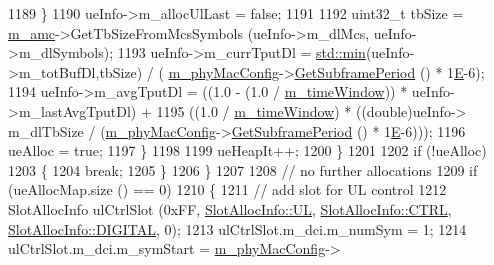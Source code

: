 \begin{DoxyCode}
1189                                 \}
1190                                 ueInfo->m\_allocUlLast = \textcolor{keyword}{false};
1191 
1192                                 uint32\_t tbSize = \hyperlink{classns3_1_1MmWaveFlexTtiPfMacScheduler_ab9cf29146f4e3094526de08ffe08b193}{m\_amc}->GetTbSizeFromMcsSymbols (ueInfo->m\_dlMcs, 
      ueInfo->m\_dlSymbols);
1193                                 ueInfo->m\_currTputDl = \hyperlink{80211b_8c_ac6afabdc09a49a433ee19d8a9486056d}{std::min}(ueInfo->m\_totBufDl,tbSize) / (
      \hyperlink{classns3_1_1MmWaveMacScheduler_a24d7af4971d2e500fe543cefbafa2fd9}{m\_phyMacConfig}->\hyperlink{classns3_1_1MmWavePhyMacCommon_a1d402260d29c8931dd3dde73b295e23d}{GetSubframePeriod} () * 1\hyperlink{packet-test-suite_8cc_a171669980e29849aa5e3722d573181ee}{E}-6);
1194                                 ueInfo->m\_avgTputDl = ((1.0 - (1.0 / 
      \hyperlink{classns3_1_1MmWaveFlexTtiPfMacScheduler_adc8b66b1890b4ba9d14f1d294af36b07}{m\_timeWindow})) * ueInfo->m\_lastAvgTputDl) +
1195                                                 ((1.0 / \hyperlink{classns3_1_1MmWaveFlexTtiPfMacScheduler_adc8b66b1890b4ba9d14f1d294af36b07}{m\_timeWindow}) * ((double)ueInfo->
      m\_dlTbSize / (\hyperlink{classns3_1_1MmWaveMacScheduler_a24d7af4971d2e500fe543cefbafa2fd9}{m\_phyMacConfig}->\hyperlink{classns3_1_1MmWavePhyMacCommon_a1d402260d29c8931dd3dde73b295e23d}{GetSubframePeriod} () * 1\hyperlink{packet-test-suite_8cc_a171669980e29849aa5e3722d573181ee}{E}-6)));
1196                                 ueAlloc = \textcolor{keyword}{true};
1197                         \}
1198 
1199                         ueHeapIt++;
1200                 \}
1201 
1202                 \textcolor{keywordflow}{if} (!ueAlloc)
1203                 \{
1204                         \textcolor{keywordflow}{break};
1205                 \}
1206         \}
1207 
1208         \textcolor{comment}{// no further allocations}
1209         \textcolor{keywordflow}{if} (ueAllocMap.size () == 0)
1210         \{
1211                 \textcolor{comment}{// add slot for UL control}
1212                 SlotAllocInfo ulCtrlSlot (0xFF, \hyperlink{structns3_1_1SlotAllocInfo_a6cad60db1d39034f1851e2cea625fe5da916b5be54594ead6ed677c570311cad2}{SlotAllocInfo::UL}, 
      \hyperlink{structns3_1_1SlotAllocInfo_a3ea7cb503bfd0c9a4df55a71b81b9331ad78b7d76ef82d56c33be1fa9c1867409}{SlotAllocInfo::CTRL}, \hyperlink{structns3_1_1SlotAllocInfo_adcbd067d82be6260b3399167d8f0b4eca47a67c342db658a08ded9ce4b49417ea}{SlotAllocInfo::DIGITAL}, 0);
1213                 ulCtrlSlot.m\_dci.m\_numSym = 1;
1214                 ulCtrlSlot.m\_dci.m\_symStart = \hyperlink{classns3_1_1MmWaveMacScheduler_a24d7af4971d2e500fe543cefbafa2fd9}{m\_phyMacConfig}->

\end{DoxyCode}
